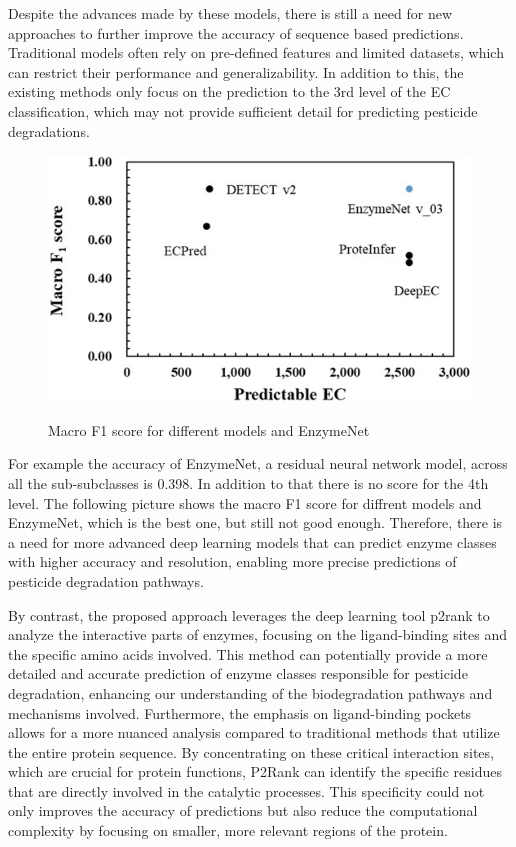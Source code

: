 Despite the advances made by these models, there is still a need for new approaches to further improve the accuracy of sequence based predictions. Traditional models often rely on pre-defined features and limited datasets, which can restrict their performance and generalizability. In addition to this, the existing methods only focus on the prediction to the 3rd level of the EC classification, which may not provide sufficient detail for predicting pesticide degradations.

\begin{figure}[hbt]
    \centering
    \begin{minipage}[t]{.8\textwidth}
    \caption{Macro F1 score for different models and EnzymeNet}
    \includegraphics[width=1\textwidth]{img/performance_existing_methods.png}
    \label{fig:EnzymeNet}
    \end{minipage}
\end{figure}

For example the accuracy of EnzymeNet, a residual neural network model, across all the sub-subclasses is 0.398. In addition to that there is no score for the 4th level. The following picture shows the macro F1 score for diffrent models and EnzymeNet, which is the best one, but still not good enough. Therefore, there is a need for more advanced deep learning models that can predict enzyme classes with higher accuracy and resolution, enabling more precise predictions of pesticide degradation pathways. \autocite{watanabeEnzymeNetResidualNeural2023}

By contrast, the proposed approach leverages the deep learning tool p2rank to analyze the interactive parts of enzymes, focusing on the ligand-binding sites and the specific amino acids involved. This method can potentially provide a more detailed and accurate prediction of enzyme classes responsible for pesticide degradation, enhancing our understanding of the biodegradation pathways and mechanisms involved. Furthermore, the emphasis on ligand-binding pockets allows for a more nuanced analysis compared to traditional methods that utilize the entire protein sequence. By concentrating on these critical interaction sites, which are crucial for protein functions, P2Rank can identify the specific residues that are directly involved in the catalytic processes. This specificity could not only improves the accuracy of predictions but also reduce the computational complexity by focusing on smaller, more relevant regions of the protein. \autocite{krivakP2RankMachineLearning2018}